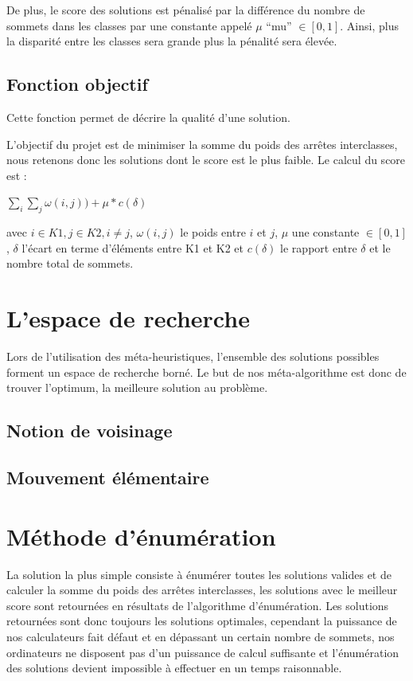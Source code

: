 \documentclass[a4paper]{article}
\begin{document}
De plus, le score des solutions est pénalisé par la différence du nombre de sommets dans les classes par une constante appelé $\mu$ ``mu'' $\in [0,1]$. Ainsi, plus la disparité entre les classes sera grande plus la pénalité sera élevée.

\subsection{Fonction objectif}
Cette fonction permet de décrire la qualité d'une solution.


L'objectif du projet est de minimiser la somme du poids des arrêtes interclasses, nous retenons donc les solutions dont le score est le plus faible. Le calcul du score est : 
\begin{center}
$\sum\limits_{i} \sum\limits_{j}  \omega (i,j)) + \mu * c(\delta)$
\end{center}
avec $i \in K1, j \in K2, i \ne j$, $\omega (i,j)$ le poids entre $i$ et $j$, $\mu$ une constante $\in [0,1]$, $\delta$ l'écart en terme d'éléments entre K1 et K2 et $c(\delta)$ le rapport entre $\delta$ et le nombre total de sommets.

\section{L'espace de recherche}
Lors de l'utilisation des méta-heuristiques, l'ensemble des solutions possibles forment un espace de recherche borné. Le but de nos méta-algorithme est donc de trouver l'optimum, la meilleure solution au problème.
	\subsection{Notion de voisinage}
	\subsection{Mouvement élémentaire}

\section{Méthode d’énumération}
La solution la plus simple consiste à énumérer toutes les solutions valides et de calculer la somme du poids des arrêtes interclasses, les solutions avec le meilleur score sont retournées en résultats de l'algorithme d'énumération. Les solutions retournées sont donc toujours les solutions optimales, cependant la puissance de nos calculateurs fait défaut et en dépassant un certain nombre de sommets, nos ordinateurs ne disposent pas d'un puissance de calcul suffisante et l'énumération des solutions devient impossible à effectuer en un temps raisonnable.
\end{document}
